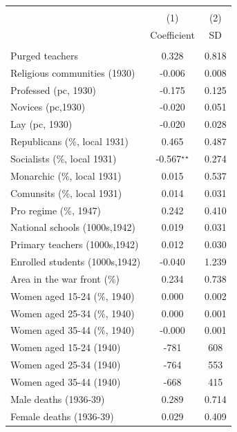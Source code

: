 \begin{tabular}{l c c }\hline\hline  \\[-0.3cm] & (1) & (2)  \\ [0.1cm] & {Coefficient} & {SD}  \\ [0.1cm] \hline \\ 
Purged teachers&	0.328&	0.818	\\
Religious communities (1930)&	-0.006&	0.008	\\
Professed (pc, 1930)&	-0.175&	0.125	\\
Novices (pc,1930)&	-0.020&	0.051	\\
Lay (pc, 1930)&	-0.020&	0.028	\\
Republicans (\%, local 1931)&	0.465&	0.487	\\
Socialists (\%, local 1931)&	-0.567$^\star$$^\star$&	0.274	\\
Monarchic (\%, local 1931)&	0.015&	0.537	\\
Comunsits (\%, local 1931)&	0.014&	0.031	\\
Pro regime (\%, 1947)&	0.242&	0.410	\\
National schools (1000s,1942)&	0.019&	0.031	\\
Primary teachers (1000s,1942)&	0.012&	0.030	\\
Enrolled students (1000s,1942)&	-0.040&	1.239	\\
Area in the war front (\%)&	0.234&	0.738	\\
Women aged 15-24 (\%, 1940) &	0.000&	0.002	\\
Women aged 25-34 (\%, 1940) &	0.000&	0.001	\\
Women aged 35-44 (\%, 1940) &	-0.000&	0.001	\\
Women aged 15-24 (1940) &	-781&	608	\\
Women aged 25-34 (1940) &	-764&	553	\\
Women aged 35-44 (1940) &	-668&	415	\\
Male deaths (1936-39)&	0.289&	0.714	\\
Female deaths (1936-39)&	0.029&	0.409	\\
\hline\hline \end{tabular}